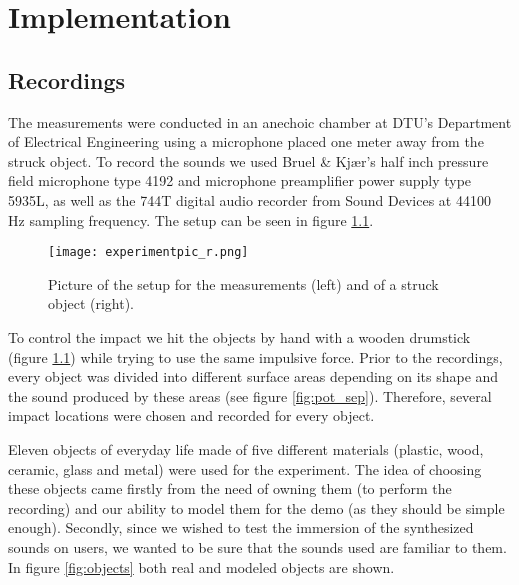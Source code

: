 \chapter{Implementation}\label{ch:implementation}


%

\section{Recordings}\label{sec:recordings}

The measurements were conducted in an anechoic chamber at DTU's Department of Electrical Engineering using a microphone placed one meter away from the struck object. To record the sounds we used Bruel \& Kjær's half inch pressure field microphone type 4192 and microphone preamplifier power supply type 5935L, as well as the 744T digital audio recorder from Sound Devices at 44100 Hz sampling frequency. The setup can be seen in figure \ref{fig:experiment}.

\begin{figure}[H]
  \centering
    \texttt{[image: experimentpic\_r.png]}
      \caption{Picture of the setup for the measurements (left) and of a struck object (right).}\label{fig:experiment}
\end{figure}

To control the impact we hit the objects by hand with a wooden drumstick (figure \ref{fig:experiment}) while trying to use the same impulsive force. Prior to the recordings, every object was divided into different surface areas depending on its shape and the sound produced by these areas (see figure \ref{fig:pot_sep}). Therefore, several impact locations were chosen and recorded for every object.

Eleven objects of everyday life made of five different materials (plastic, wood, ceramic, glass and metal) were used for the experiment. The idea of choosing these objects came firstly from the need of owning them (to perform the recording) and our ability to model them for the demo (as they should be simple enough). Secondly, since we wished to test the immersion of the synthesized sounds on users, we wanted to be sure that the sounds used are familiar to them. In figure \ref{fig:objects} both real and modeled objects are shown. 

